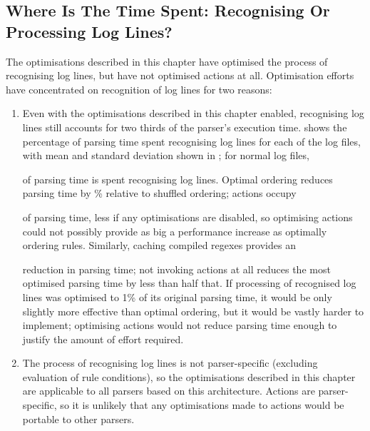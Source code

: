 
\FloatBarrier{}

\subsection{Where Is The Time Spent: Recognising Or Processing Log Lines?}

\label{recognising vs processing}

The optimisations described in this chapter have optimised the process of
recognising log lines, but have not optimised actions at all.  Optimisation
efforts have concentrated on recognition of log lines for two reasons:

\begin{enumerate}

    \item Even with the optimisations described in this chapter enabled,
        recognising log lines still accounts for two thirds of the parser's
        execution time.   shows the percentage of parsing time
        spent recognising log lines for each of the \numberOFlogFILES{} log
        files, with mean and standard deviation shown in
        ; for normal log files,
        
        of parsing time is spent recognising log lines.  Optimal ordering
        reduces parsing time by
        \%
        relative to shuffled ordering; actions occupy
        
        of parsing time, less if any optimisations are disabled, so
        optimising actions could not possibly provide as big a performance
        increase as optimally ordering rules.  Similarly, caching compiled
        regexes provides an
        
        reduction in parsing time; not invoking actions at all reduces the
        most optimised parsing time by less than half that.  If processing
        of recognised log lines was optimised to 1\% of its original
        parsing time, it would be only slightly more effective than optimal
        ordering, but it would be vastly harder to implement; optimising
        actions would not reduce parsing time enough to justify the amount
        of effort required.

    \item The process of recognising log lines is not parser-specific
        (excluding evaluation of rule conditions), so the optimisations
        described in this chapter are applicable to all parsers based on
        this architecture.  Actions are parser-specific, so it is unlikely
        that any optimisations made to actions would be portable to other
        parsers.

\end{enumerate}

